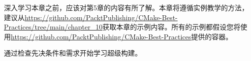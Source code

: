 深入学习本章之前，应该对第5章的内容有所了解。本章将遵循实例教学的方法，建议从\url{https://github.com/PacktPublishing/CMake-Best-Practices/tree/main/chapter_10}获取本章的示例内容。所有的示例都假设您将使用\url{https://github.com/PacktPublishing/CMake-Best-Practices}提供的容器。

通过检查先决条件和需求开始学习超级构建。